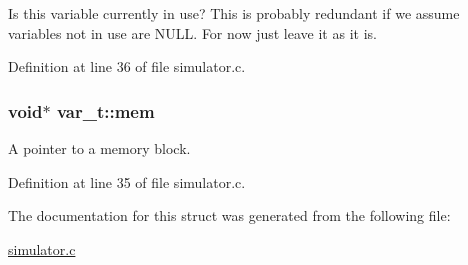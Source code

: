 Is this variable currently in use? This is probably redundant if we assume variables not in use are N\+U\+LL. For now just leave it as it is. 



Definition at line 36 of file simulator.\+c.

\subsubsection[{\texorpdfstring{mem}{mem}}]{\setlength{\rightskip}{0pt plus 5cm}void$\ast$ var\+\_\+t\+::mem}\hypertarget{structvar__t_a10c34ec2d6e86f971cf9702a4651267d}{}\label{structvar__t_a10c34ec2d6e86f971cf9702a4651267d}


A pointer to a memory block. 



Definition at line 35 of file simulator.\+c.



The documentation for this struct was generated from the following file\+:\begin{DoxyCompactItemize}
\item 
\hyperlink{simulator_8c}{simulator.\+c}\end{DoxyCompactItemize}
